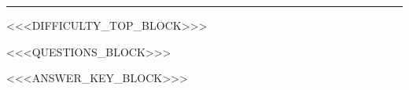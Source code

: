 \documentclass[12pt]{article}
\newif\ifshowsolution
\newenvironment{solution}%
    {\par\noindent\textbf{\Large Detailed Solutions}\par\bigskip\linespread{1.3}\selectfont}%
    {\par}%
\newenvironment{solution}%
    {\comment}%
    {\endcomment}%
\begin{document}

\Large



\medskip\hrule
\normalsize
<<<DIFFICULTY_TOP_BLOCK>>>
\begin{mcquestions}
<<<QUESTIONS_BLOCK>>>
\end{mcquestions}

<<<ANSWER_KEY_BLOCK>>>

\ifshowsolution
  \clearpage
  \begin{solution}
  <<<SOLUTIONS_BLOCK>>>
  \end{solution}
\fi
\end{document}
